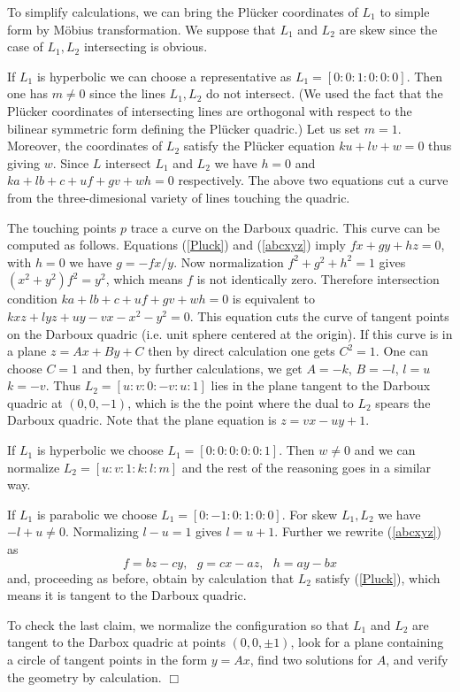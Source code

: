 \documentclass[11pt,a4paper]{article}
\begin{document}
 To simplify calculations, we can bring the Pl\"ucker coordinates of $L_1$ to simple form by M\"obius transformation. We suppose that $L_1$ and $L_2$ are skew since the case of $L_1,L_2$ intersecting is obvious. 
 
If $L_1$ is hyperbolic we can choose a representative as $L_1=[0:0:1:0:0:0]$. Then  one has $m\ne 0$ since the lines $L_1,L_2$ do not intersect. (We used the fact that the Pl\"ucker coordinates of intersecting lines are orthogonal with respect to    the bilinear symmetric form defining the Pl\"ucker quadric.) Let us set $m=1$. Moreover, the coordinates of $L_2$ satisfy the Pl\"ucker equation $ku+lv+w=0$ thus giving $w$.  Since $L$ intersect $L_1$ and $L_2$ we have $h=0$ and $ka+lb+c+uf+gv+wh=0$ respectively.  The above two equations cut a curve from the three-dimesional variety of lines touching the quadric. 


The touching points $p$ trace a  curve on the Darboux quadric.
This curve can be computed as follows. Equations (\ref{Pluck}) and (\ref{abcxyz}) imply  $fx + gy + hz=0$, with $h=0$ we have $g = -fx/y$. Now normalization $f^2+g^2+h^2=1$ gives $(x^2 + y^2)f^2 = y^2$, which means $f$ is not identically zero.  Therefore intersection condition $ka+lb+c+uf+gv+wh=0$ is equivalent to $kxz + lyz + uy - vx - x^2 - y^2=0$. This equation cuts the curve of tangent points on the Darboux quadric (i.e. unit sphere centered at the origin).  
If this curve is in a plane $z = Ax + By + C$ then by direct calculation one gets $C^2=1$. One can choose $C=1$ and then, by further calculations, we get $A=-k$, $B=-l$, $l=u$ $k=-v$. Thus $L_2=[u:v:0:-v:u:1]$ lies in the plane tangent to the Darboux quadric at $(0,0,-1)$, which is the the point where the dual to $L_2$ spears the Darboux quadric. Note that the plane equation is $z = vx -uy + 1$. 

If $L_1$ is hyperbolic we choose $L_1=[0:0:0:0:0:1]$. Then $w\ne 0$ and we can normalize $L_2=[u:v:1:k:l:m]$ and the rest of the reasoning goes in a similar way. 

If $L_1$ is parabolic we choose $L_1=[0:-1:0:1:0:0]$. For skew $L_1,L_2$ we have $-l+u\ne 0$. Normalizing $l-u=1$ gives $l=u+1$. Further we rewrite (\ref{abcxyz}) as  
$$
 f = b z - c y, \ \ \  g = cx-a z, \ \ \  h = a y - b x
 $$
 and, proceeding as before, obtain by calculation that $L_2$ satisfy (\ref{Pluck}), which means it is tangent to the Darboux quadric. 
 
 To check the last claim, we normalize the configuration so that $L_1$ and $L_2$ are tangent to the Darbox quadric at points $(0,0,\pm 1)$,  look for a plane containing a circle of tangent points in the form $y=Ax$, find two solutions for $A$, and verify the geometry by calculation.         \hfill $\Box$
 
\end{document}
